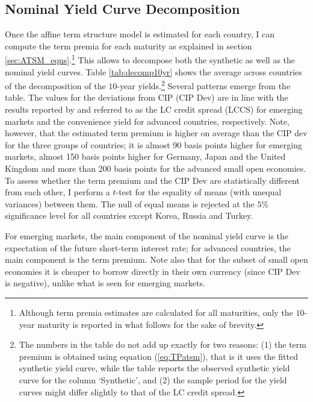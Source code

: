 \subsection{Nominal Yield Curve Decomposition}
Once the affine term structure model is estimated for each country, I can compute the term premia for each maturity as explained in section \ref{sec:ATSM_eqns}.\footnote{Although term premia estimates are calculated for all maturities, only the $10$-year maturity is reported in what follows for the sake of brevity.} This allows to decompose both the synthetic as well as the nominal yield curves. Table \ref{tab:decomp10yr} shows the average across countries of the decomposition of the $10$-year yields.\footnote{The numbers in the table do not add up exactly for two reasons: (1) the term premium is obtained using equation (\ref{eq:TPatsm}), that is it uses the fitted synthetic yield curve, while the table reports the observed synthetic yield curve for the column `Synthetic', and (2) the sample period for the yield curves might differ slightly to that of the LC credit spread.} Several patterns emerge from the table. The values for the deviations from CIP (CIP Dev) are in line with the results reported by \cite{DuSchreger:2016a} and \cite{DuImSchreger:2018} referred to as the LC credit spread (LCCS) for emerging markets and the convenience yield for advanced countries, respectively. Note, however, that the estimated term premium is higher on average than the CIP dev for the three groups of countries; it is almost 90 basis points higher for emerging markets, almost 150 basis points higher for Germany, Japan and the United Kingdom and more than 200 basis points for the advanced small open economies. To assess whether the term premium and the CIP Dev are statistically different from each other, I perform a $t$-test for the equality of means (with unequal variances) between them. The null of equal means is rejected at the $5$\% significance level for all countries except Korea, Russia and Turkey.
	
%	

For emerging markets, the main component of the nominal yield curve is the expectation of the future short-term interest rate; for advanced countries, the main component is the term premium. Note also that for the subset of small open economies it is cheaper to borrow directly in their own currency (since CIP Dev is negative), unlike what is seen for emerging markets.

